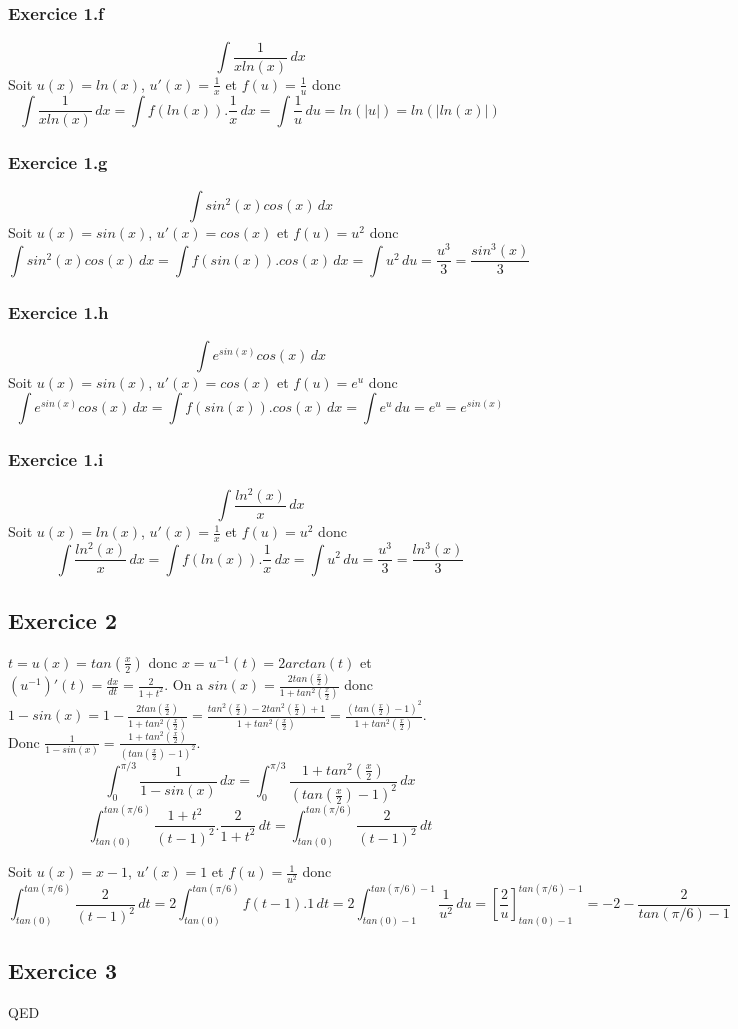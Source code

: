 \documentclass[]{book}
\theoremstyle{definition}
\begin{document}
\subsubsection*{Exercice 1.f}
$$\int{\frac{1}{xln(x)}\,dx}$$
Soit $u(x)=ln(x)$, $u'(x)=\frac{1}{x}$ et $f(u) = \frac{1}{u}$ donc
$$\int{\frac{1}{xln(x)}\,dx} = \int{f(ln(x)).\frac{1}{x}\,dx} = \int{\frac{1}{u}\,du} = ln(|u|) = ln(|ln(x)|)$$

\subsubsection*{Exercice 1.g}
$$\int{sin^2(x)cos(x)\,dx}$$
Soit $u(x)=sin(x)$, $u'(x)=cos(x)$ et $f(u)=u^2$ donc
$$\int{sin^2(x)cos(x)\,dx} = \int{f(sin(x)).cos(x)\,dx} = \int{u^2\,du} = \frac{u^3}{3} = \frac{sin^3(x)}{3}$$

\subsubsection*{Exercice 1.h}
$$\int{e^{sin(x)}cos(x)\,dx}$$
Soit $u(x)=sin(x)$, $u'(x)=cos(x)$ et $f(u)=e^u$ donc
$$\int{e^{sin(x)}cos(x)\,dx} = \int{f(sin(x)).cos(x)\,dx} = \int{e^u\,du} = e^u = e^{sin(x)}$$
 

\subsubsection*{Exercice 1.i}
$$\int{\frac{ln^2(x)}{x}\,dx}$$
Soit $u(x) = ln(x)$, $u'(x)=\frac{1}{x}$ et $f(u)=u^2$ donc
$$\int{\frac{ln^2(x)}{x}\,dx} = \int{f(ln(x)).\frac{1}{x}\,dx} = \int{u^2\,du} = \frac{u^3}{3} = \frac{ln^3(x)}{3}$$


\subsection*{Exercice 2}
$t = u(x) = tan(\frac{x}{2})$ donc $x = u^{-1}(t) = 2arctan(t)$ et $(u^{-1})'(t) = \frac{dx}{dt} = \frac{2}{1+t^2}$.
On a $sin(x)=\frac{2tan(\frac{x}{2})}{1+tan^2(\frac{x}{2})}$ donc $1-sin(x) = 1 - \frac{2tan(\frac{x}{2})}{1+tan^2(\frac{x}{2})} = \frac{tan^2(\frac{x}{2})-2tan^2(\frac{x}{2})+1}{1+tan^2(\frac{x}{2})} = \frac{(tan(\frac{x}{2})-1)^2}{1+tan^2(\frac{x}{2})}$.
\\
Donc $\frac{1}{1-sin(x)} = \frac{1+tan^2(\frac{x}{2})}{(tan(\frac{x}{2})-1)^2}$.
$$\int_0^{\pi/3}{\frac{1}{1-sin(x)}\,dx} = \int_0^{\pi/3}{\frac{1+tan^2(\frac{x}{2})}{(tan(\frac{x}{2})-1)^2}\,dx}$$
$$\int_{tan(0)}^{tan(\pi/6)}{\frac{1+t^2}{(t-1)^2}.\frac{2}{1+t^2}\,dt} = \int_{tan(0)}^{tan(\pi/6)}{\frac{2}{(t-1)^2}\,dt}$$

Soit $u(x)=x-1$, $u'(x)=1$ et $f(u) = \frac{1}{u^2}$ donc
$$\int_{tan(0)}^{tan(\pi/6)}{\frac{2}{(t-1)^2}\,dt} = 2\int_{tan(0)}^{tan(\pi/6)}{f(t-1).1\,dt}=2\int_{tan(0)-1}^{tan(\pi/6)-1}{\frac{1}{u^2}\,du} = [\frac{2}{u}]_{tan(0)-1}^{tan(\pi/6)-1} = -2 - \frac{2}{tan(\pi/6)-1}$$


\subsection*{Exercice 3}

QED
\end{document}
